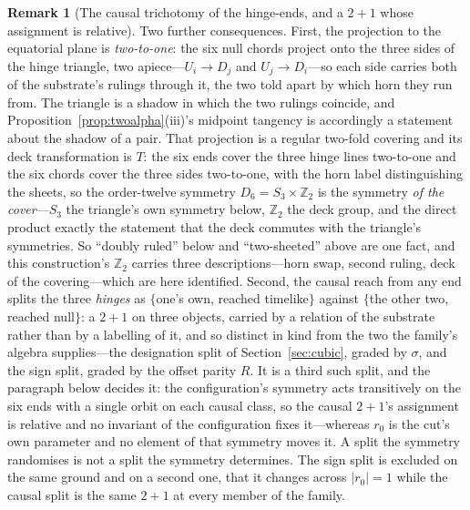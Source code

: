 \documentclass[11pt,a4paper]{article}
\theoremstyle{definition}
\newtheorem{remark}[theorem]{Remark}
\begin{document}
\begin{remark}[The causal trichotomy of the hinge-ends, and a $2{+}1$ whose assignment is relative]
Two further consequences. First, the projection to the equatorial plane is \emph{two-to-one}: the six null chords project onto the three sides of the hinge triangle, two apiece---$U_{i}\to D_{j}$ and $U_{j}\to D_{i}$---so each side carries both of the substrate's rulings through it, the two told apart by which horn they run from. The triangle is a shadow in which the two rulings coincide, and Proposition~\ref{prop:twoalpha}(iii)'s midpoint tangency is accordingly a statement about the shadow of a pair. That projection is a regular two-fold covering and its deck transformation is $T$: the six ends cover the three hinge lines two-to-one and the six chords cover the three sides two-to-one, with the horn label distinguishing the sheets, so the order-twelve symmetry $D_{6}=S_{3}\times\mathbb{Z}_{2}$ is the symmetry \emph{of the cover}---$S_{3}$ the triangle's own symmetry below, $\mathbb{Z}_{2}$ the deck group, and the direct product exactly the statement that the deck commutes with the triangle's symmetries. So ``doubly ruled'' below and ``two-sheeted'' above are one fact, and this construction's $\mathbb{Z}_{2}$ carries three descriptions---horn swap, second ruling, deck of the covering---which are here identified. Second, the causal reach from any end splits the three \emph{hinges} as $\{$one's own, reached timelike$\}$ against $\{$the other two, reached null$\}$: a $2{+}1$ on three objects, carried by a relation of the substrate rather than by a labelling of it, and so distinct in kind from the two the family's algebra supplies---the designation split of Section~\ref{sec:cubic}, graded by $\sigma$, and the sign split, graded by the offset parity $R$. It is a third such split, and the paragraph below decides it: the configuration's symmetry acts transitively on the six ends with a single orbit on each causal class, so the causal $2{+}1$'s assignment is relative and no invariant of the configuration fixes it---whereas $r_{0}$ is the cut's own parameter and no element of that symmetry moves it. A split the symmetry randomises is not a split the symmetry determines. The sign split is excluded on the same ground and on a second one, that it changes across $|r_{0}|=1$ while the causal split is the same $2{+}1$ at every member of the family.


\end{remark}
\end{document}
